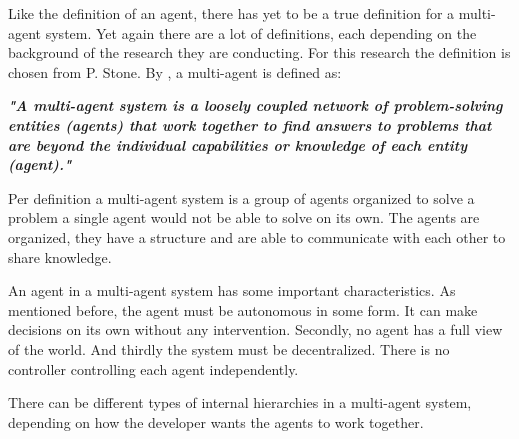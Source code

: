 
Like the definition of an agent, there has yet to be a true definition for a multi-agent system. 
Yet again there are a lot of definitions, each depending on the background of the research they are conducting.
 For this research the definition is chosen from P. Stone. By \citet{mas:def}, a multi-agent is defined as:

\begin{center}
    \textit{\textbf{"A multi-agent system is a loosely coupled network of problem-solving entities (agents) that work together to find answers to problems that are beyond the individual capabilities or knowledge of each entity (agent)."}}
\end{center}

 
Per definition a multi-agent system is a group of agents organized to solve a problem a single agent would not be able to solve on its own. 
The agents are organized, they have a structure and are able to communicate with each other to share knowledge. 

An agent in a multi-agent system has some important characteristics. As mentioned before, the agent must be autonomous in some form. 
It can make decisions on its own without any intervention. Secondly, no agent has a full view of the world. And thirdly the system must be decentralized. 
There is no controller controlling each agent independently. 

There can be different types of internal hierarchies in a multi-agent system, depending on how the developer wants the agents to work together.
